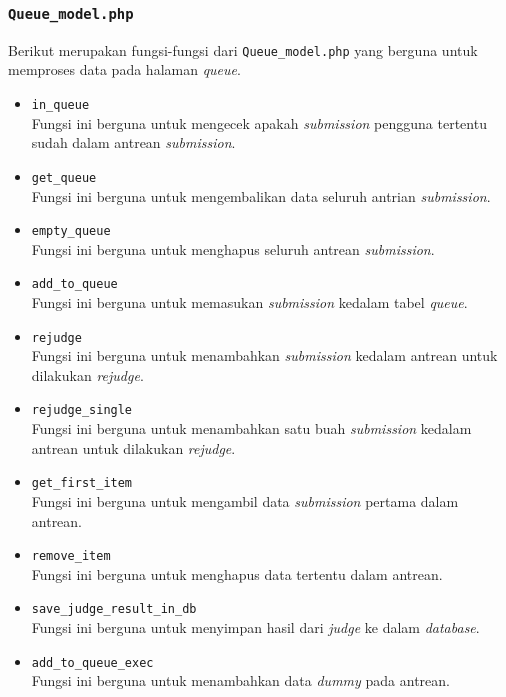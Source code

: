\subsubsection{\texttt{Queue\_model.php}}
Berikut merupakan fungsi-fungsi dari \texttt{Queue\_model.php} yang berguna untuk memproses data pada halaman \textit{queue}.
\begin{itemize}
	\item \texttt{in\_queue}\\
	Fungsi ini berguna untuk mengecek apakah \textit{submission} pengguna tertentu sudah dalam antrean \textit{submission}.
	\item \texttt{get\_queue}\\
	Fungsi ini berguna untuk mengembalikan data seluruh antrian \textit{submission}.
	\item \texttt{empty\_queue}\\
	Fungsi ini berguna untuk menghapus seluruh antrean \textit{submission}.
	\item \texttt{add\_to\_queue}\\
	Fungsi ini berguna untuk memasukan \textit{submission} kedalam tabel \textit{queue}.
	\item \texttt{rejudge}\\
	Fungsi ini berguna untuk menambahkan \textit{submission} kedalam antrean untuk dilakukan \textit{rejudge}.
	\item \texttt{rejudge\_single}\\
	Fungsi ini berguna untuk menambahkan satu buah \textit{submission} kedalam antrean untuk dilakukan \textit{rejudge}.
	\item \texttt{get\_first\_item}\\
	Fungsi ini berguna untuk mengambil data \textit{submission} pertama dalam antrean.
	\item \texttt{remove\_item}\\
	Fungsi ini berguna untuk menghapus data tertentu dalam antrean.
	\item \texttt{save\_judge\_result\_in\_db}\\
	Fungsi ini berguna untuk menyimpan hasil dari \textit{judge} ke dalam \textit{database}.
	\item \texttt{add\_to\_queue\_exec}\\
	Fungsi ini berguna untuk menambahkan data \textit{dummy} pada antrean.
\end{itemize}
